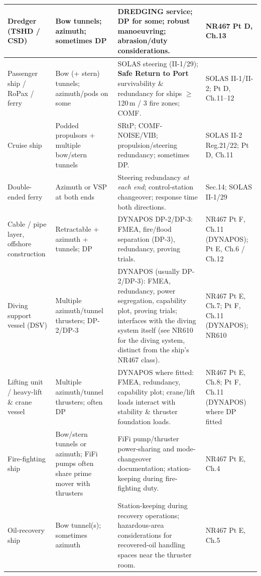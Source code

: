 \documentclass[11pt,a4paper]{report}
\begin{document}
\begin{longtable}{|p{2.9cm}|p{3.7cm}|p{5.9cm}|p{1.8cm}|}
Dredger (TSHD / CSD) & Bow tunnels; azimuth; sometimes DP &
DREDGING service; DP for some; robust manoeuvring; abrasion/duty considerations.
& NR467 Pt D, Ch.13 \\
\hline

Passenger ship / RoPax / ferry & Bow (+ stern) tunnels; azimuth/pods on some &
SOLAS steering (II-1/29); \textbf{Safe Return to Port} survivability \&
redundancy for ships $\geq$120\,m / 3 fire zones; COMF. & SOLAS II-1/II-2; Pt D, Ch.11--12 \\
\hline

Cruise ship & Podded propulsors + multiple bow/stern tunnels &
SRtP; COMF-NOISE/VIB; propulsion/steering redundancy; sometimes DP. &
SOLAS II-2 Reg.21/22; Pt D, Ch.11 \\
\hline

Double-ended ferry & Azimuth or VSP at both ends &
Steering redundancy \emph{at each end}; control-station changeover; response
time both directions. & Sec.14; SOLAS II-1/29 \\
\hline

Cable / pipe layer, offshore construction & Retractable + azimuth + tunnels; DP &
DYNAPOS DP-2/DP-3: FMEA, fire/flood separation (DP-3), redundancy, proving
trials. & NR467 Pt F, Ch.11 (DYNAPOS); Pt E, Ch.6 / Ch.12 \\
\hline

Diving support vessel (DSV) & Multiple azimuth/tunnel thrusters; DP-2/DP-3 &
DYNAPOS (usually DP-2/DP-3): FMEA, redundancy, power segregation, capability
plot, proving trials; interfaces with the diving system itself (see NR610 for
the diving system, distinct from the ship's NR467 class). & NR467 Pt E, Ch.7;
Pt F, Ch.11 (DYNAPOS); NR610 \\
\hline

Lifting unit / heavy-lift \& crane vessel & Multiple azimuth/tunnel thrusters;
often DP & DYNAPOS where fitted: FMEA, redundancy, capability plot; crane/lift
loads interact with stability \& thruster foundation loads. & NR467 Pt E, Ch.8;
Pt F, Ch.11 (DYNAPOS) where DP fitted \\
\hline

Fire-fighting ship & Bow/stern tunnels or azimuth; FiFi pumps often share prime
mover with thrusters & FiFi pump/thruster power-sharing and mode-changeover
documentation; station-keeping during fire-fighting duty. & NR467 Pt E, Ch.4 \\
\hline

Oil-recovery ship & Bow tunnel(s); sometimes azimuth &
Station-keeping during recovery operations; hazardous-area considerations for
recovered-oil handling spaces near the thruster room. & NR467 Pt E, Ch.5 \\
\hline


\end{longtable}
\end{document}
